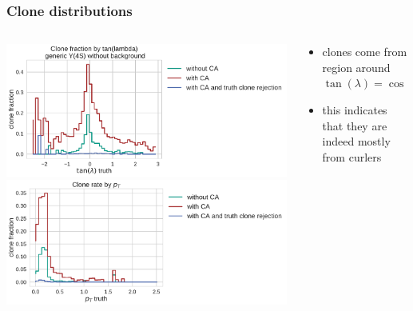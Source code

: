 \documentclass[18pt]{beamer}
\begin{document}
\begin{frame}
  \frametitle{Clone distributions}
    \begin{columns}
      \begin{column}{0.65\textwidth}
        \includegraphics[width=\textwidth]{figures/clone_rate_by_tlambda.pdf}\\
      \includegraphics[width=\textwidth]{figures/clone_rate_by_pt.pdf}
    
    \end{column}
    \begin{column}{0.35\textwidth}
      \begin{itemize}
      \item clones come from region around $\tan(\lambda) =\cos(\theta)= 0$
      \item this indicates that they are indeed mostly from curlers
      \end{itemize}
    \end{column}
  \end{columns}
\end{frame}
\end{document}
